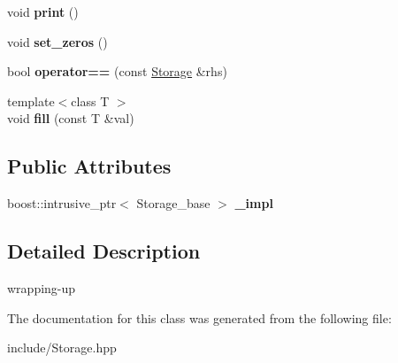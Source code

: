 \begin{DoxyCompactItemize}
\item 
\mbox{\label{classcytnx_1_1Storage_a4b5cc72fc3a1ce91a746047538ea18dd}} 
void {\bfseries print} ()
\item 
\mbox{\label{classcytnx_1_1Storage_a7e854529c99108b0acc3e5e2b185244b}} 
void {\bfseries set\+\_\+zeros} ()
\item 
\mbox{\label{classcytnx_1_1Storage_ad304e00cf3d472ea0355af6b40c4529d}} 
bool {\bfseries operator==} (const \hyperlink{classcytnx_1_1Storage}{Storage} \&rhs)
\item 
\mbox{\label{classcytnx_1_1Storage_a48f0424f051a4b3a821eb964be4cd5db}} 
{\footnotesize template$<$class T $>$ }\\void {\bfseries fill} (const T \&val)
\end{DoxyCompactItemize}
\subsection*{Public Attributes}
\begin{DoxyCompactItemize}
\item 
\mbox{\label{classcytnx_1_1Storage_a41588ac45db0467c4e277bc4e572908a}} 
boost\+::intrusive\+\_\+ptr$<$ Storage\+\_\+base $>$ {\bfseries \+\_\+impl}
\end{DoxyCompactItemize}


\subsection{Detailed Description}
wrapping-\/up 

The documentation for this class was generated from the following file\+:\begin{DoxyCompactItemize}
\item 
include/Storage.\+hpp\end{DoxyCompactItemize}
